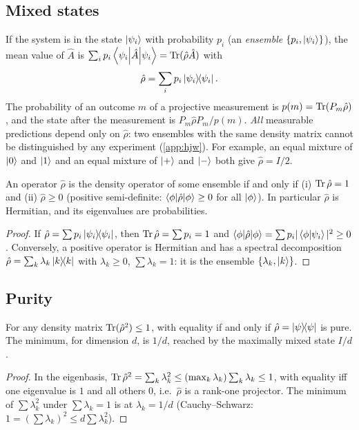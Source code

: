 \subsection{Mixed states}
If the system is in the state $\left|\psi_i\right\rangle$ with probability $p_i$ (an \emph{ensemble} $\{p_i,\left|\psi_i\right\rangle\}$), the mean value of $\hat A$ is
$\sum_ip_i\left\langle\psi_i\middle|\hat A\middle|\psi_i\right\rangle=\operatorname{Tr}(\hat\rho\hat A)$ with
\begin{equation}
  \hat\rho=\sum_ip_i\left|\psi_i\middle\rangle\!\middle\langle\psi_i\right|.
\end{equation}
The probability of an outcome $m$ of a projective measurement is $p(m)=\operatorname{Tr}(P_m\hat\rho)$, and the state after the measurement is $P_m\hat\rho P_m/p(m)$.
\emph{All} measurable predictions depend only on $\hat\rho$: two ensembles with the same density matrix cannot be distinguished by any experiment
(\cref{app:hjw}). For example, an equal mixture of $\left|0\right\rangle$ and $\left|1\right\rangle$ and an equal mixture of $\left|+\right\rangle$ and $\left|-\right\rangle$ both give $\hat\rho=I/2$.

\begin{theorem}[Characterization]
An operator $\hat\rho$ is the density operator of some ensemble if and only if (i) $\operatorname{Tr}\hat\rho=1$ and (ii) $\hat\rho\ge0$ (positive semi-definite:
$\left\langle\phi\middle|\hat\rho\middle|\phi\right\rangle\ge0$ for all $\left|\phi\right\rangle$). In particular $\hat\rho$ is Hermitian, and its eigenvalues are probabilities.
\end{theorem}
\begin{proof}
If $\hat\rho=\sum p_i\left|\psi_i\middle\rangle\!\middle\langle\psi_i\right|$, then $\operatorname{Tr}\hat\rho=\sum p_i=1$ and $\left\langle\phi\middle|\hat\rho\middle|\phi\right\rangle=\sum p_i|\left\langle\phi\middle|\psi_i\right\rangle|^2\ge0$. Conversely, a positive operator is
Hermitian and has a spectral decomposition $\hat\rho=\sum_k\lambda_k\left|k\middle\rangle\!\middle\langle k\right|$ with $\lambda_k\ge0$, $\sum\lambda_k=1$: it is the ensemble $\{\lambda_k,\left|k\right\rangle\}$.
\end{proof}

\subsection{Purity}
\begin{proposition}
For any density matrix $\operatorname{Tr}(\hat\rho^2)\le1$, with equality if and only if $\hat\rho=\left|\psi\middle\rangle\!\middle\langle\psi\right|$ is pure. The minimum, for dimension $d$, is $1/d$, reached by the maximally mixed state $I/d$.
\end{proposition}
\begin{proof}
In the eigenbasis, $\operatorname{Tr}\hat\rho^2=\sum_k\lambda_k^2\le(\max_k\lambda_k)\sum_k\lambda_k\le1$, with equality iff one eigenvalue is $1$ and all others $0$, i.e.\ $\hat\rho$ is a
rank-one projector. The minimum of $\sum\lambda_k^2$ under $\sum\lambda_k=1$ is at $\lambda_k=1/d$ (Cauchy--Schwarz: $1=(\sum\lambda_k)^2\le d\sum\lambda_k^2$).
\end{proof}

